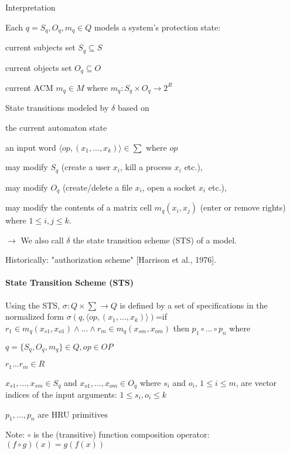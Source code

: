 \documentclass[a4paper]{article}
\begin{document}
\begin{multicols}{3}
    Interpretation
    \begin{itemize*}
        \item Each $q=S_q,O_q,m_q\in Q$ models a system’s protection state:
              \begin{itemize*}
                  \item current subjects set $S_q\subseteq S$
                  \item current objects set $O_q\subseteq O$
                  \item current ACM $m_q\in M$ where $m_q:S_q\times O_q\rightarrow 2^R$
              \end{itemize*}
        \item State transitions modeled by $\delta$ based on
              \begin{itemize*}
                  \item the current automaton state
                  \item an input word $⟨op,(x_1,...,x_k)⟩\in\sum$ where $op$
                        \begin{itemize*}
                            \item may modify $S_q$ (create a user $x_i$, kill a process $x_i$ etc.),
                            \item may modify $O_q$ (create/delete a file $x_i$, open a socket $x_i$ etc.),
                            \item may modify the contents of a matrix cell $m_q(x_i,x_j)$ (enter or remove rights) where $1\leq i,j\leq k$.
                        \end{itemize*}
                  \item $\rightarrow$  We also call $\delta$ the state transition scheme (STS) of a model.
                  \item Historically: "authorization scheme" [Harrison et al., 1976].
              \end{itemize*}
    \end{itemize*}

    \paragraph{State Transition Scheme (STS)}
    Using the STS, $\sigma:Q\times\sum\rightarrow Q$ is defined by a set of specifications in the normalized form
    $\sigma(q,⟨op,(x_1,...,x_k)⟩)$=if $r_1\in m_q(x_{s1},x_{o1}) \wedge ... \wedge r_m\in m_q(x_{sm},x_{om})$ then $p_1\circ ...\circ p_n$ where
    \begin{itemize*}
        \item $q=\{S_q,O_q,m_q\}\in Q,op\in OP$
        \item $r_1 ...r_m\in R$
        \item $x_{s1},...,x_{sm}\in S_q$ and $x_{o1},...,x_{om}\in O_q$ where $s_i$ and $o_i$, $1\leq i\leq m$, are vector indices of the input arguments: $1\leq s_i,o_i\leq k$
        \item $p_1,...,p_n$ are HRU primitives
        \item Note: $\circ$ is the (transitive) function composition operator: $(f\circ g)(x)=g(f(x))$
    \end{itemize*}


\end{multicols}
\end{document}
